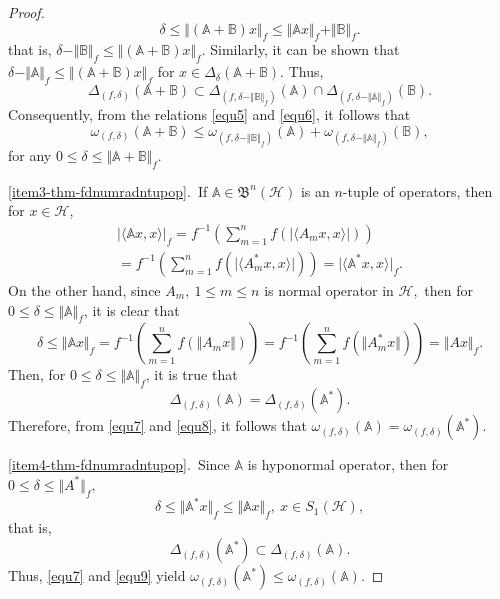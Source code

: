 \documentclass[12pt]{article}
\begin{document}
\begin{proof}
\[
\delta \leq \Vert (\mathbb{A}+\mathbb{B})x\Vert_f \leq \Vert \mathbb{A}x\Vert_f + \Vert \mathbb{B}\Vert_f.
\]
that is,
\(
\delta - \Vert \mathbb{B} \Vert_{f} \leq \Vert (\mathbb{A}+\mathbb{B})x\Vert_{f}.
\)
Similarly, it can be shown that
\(
\delta - \Vert \mathbb{A} \Vert_{f} \leq \Vert (\mathbb{A}+\mathbb{B})x \Vert_{f}
\)
for $x \in \Delta_{\delta}({\mathbb{A}+\mathbb{B}}).$
Thus,
\begin{equation}
\label{equ6}
\Delta_{(f,\delta)}(\mathbb{A}+\mathbb{B})
\subset
\Delta_{(f,\delta-\Vert \mathbb{B} \Vert_{f})}(\mathbb{A})
\cap
\Delta_{(f,\delta-\Vert \mathbb{A} \Vert_{f})}(\mathbb{B}).
\end{equation}
Consequently, from the relations \eqref{equ5} and \eqref{equ6}, it follows that
\[
\omega_{(f,\delta)}(\mathbb{A}+\mathbb{B})
\le
\omega_{(f,\delta-\Vert \mathbb{B} \Vert_{f})}(\mathbb{A})
+
\omega_{(f,\delta-\Vert \mathbb{A} \Vert_{f})}(\mathbb{B}),
\]
for any $ 0 \leq \delta \leq \Vert \mathbb{A} + \mathbb{B} \Vert_{f}$.

\noindent \ref{item3-thm-fdnumradntupop}.\ If $\mathbb{A}  \in \mathfrak{B}^{n}(\mathcal{H})$ is an $n$-tuple of operators, then for $x \in \mathcal{H}$,
\begin{equation}
\label{equ7}
\begin{array}{l}
\vert\langle \mathbb{A}x, x \rangle\vert_{f}
= f^{-1}\left( \sum\limits_{m=1}^{n} f\left(  \vert\langle A_m x, x \rangle\vert \right)  \right) \\
= f^{-1}\left( \sum\limits_{m=1}^{n} f\left(  \vert\langle A_m^{*} x, x \rangle\vert \right)  \right)
= \vert\langle \mathbb{A}^{*} x, x \rangle\vert_{f}.
\end{array}
\end{equation}
On the other hand, since $ A_{m}, \ 1\leq m \leq n $ is normal operator in $ \mathcal{H}, $ then
for $0 \leq \delta \leq \Vert \mathbb{A} \Vert_{f}$, it is clear that
\[
\delta \leq \Vert \mathbb{A} x \Vert_{f}
= f^{-1}\left( \sum\limits_{m=1}^{n} f\left(  \Vert A_m x \Vert \right)  \right)
= f^{-1}\left( \sum\limits_{m=1}^{n} f\left(  \Vert A_m^{*} x\Vert \right)  \right)
= \Vert A x\Vert_{f}.
\]
Then, for $0 \leq \delta \leq \Vert \mathbb{A} \Vert_{f}$, it is true that
\begin{equation}
\label{equ8}
\Delta_{(f,\delta)}(\mathbb{A})
=
\Delta_{(f,\delta)}(\mathbb{A}^{*}).
\end{equation}
Therefore, from \eqref{equ7} and \eqref{equ8}, it follows that
\(
\omega_{(f,\delta)}(\mathbb{A})
=
\omega_{(f,\delta)}(\mathbb{A}^{*}).
\)

\noindent \ref{item4-thm-fdnumradntupop}.\ Since $ \mathbb{A} $ is hyponormal operator, then for
$ 0 \leq \delta \leq \Vert A^{*}\Vert_{f}, $
\[
\delta \leq \Vert \mathbb{A}^{*}x\Vert_{f} \leq \Vert \mathbb{A}x\Vert_{f}, \
x \in S_{1}(\mathcal{H}),
\]
that is,
\begin{equation}
\label{equ9}
\Delta_{(f,\delta)}(\mathbb{A}^{*})
\subset
\Delta_{(f,\delta)}(\mathbb{A}).
\end{equation}
Thus, \eqref{equ7} and \eqref{equ9} yield
\( \omega_{(f,\delta)}(\mathbb{A}^{*}) \leq \omega_{(f,\delta)}(\mathbb{A}).   \)
\end{proof}
\end{document}
